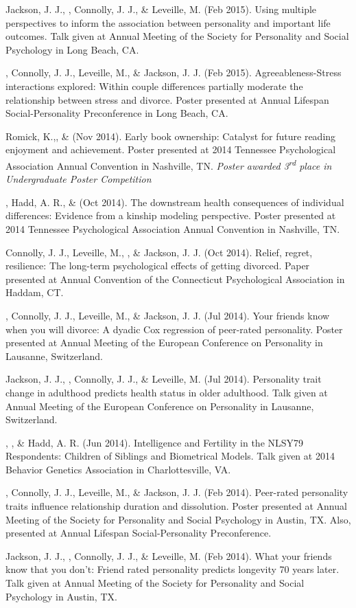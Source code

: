 %
\item Jackson, J. J., \meb, Connolly, J. J., \& Leveille, M. (Feb 2015). Using multiple perspectives to inform the association between personality and important life outcomes. Talk given at Annual Meeting of the Society for Personality and Social Psychology in Long Beach, CA.
%
\item\meb, Connolly, J. J., Leveille, M., \& Jackson, J. J. (Feb 2015). Agreeableness-Stress interactions explored: Within couple differences partially moderate the relationship between stress and divorce. Poster presented at Annual Lifespan Social-Personality Preconference in Long Beach, CA.
%
\item Romick, K.,\nota \meb, \& \joe (Nov 2014). Early book ownership: Catalyst for future reading enjoyment and achievement. Poster presented at 2014 Tennessee Psychological Association Annual Convention in  Nashville, TN. \textit{Poster awarded 3\textsuperscript{rd} place in Undergraduate Poster Competition}
%
\item\meb, Hadd, A. R., \& \joe (Oct 2014). The downstream health consequences of individual differences: Evidence from a kinship modeling perspective. Poster presented at 2014 Tennessee Psychological Association Annual Convention in Nashville, TN.
%
\item Connolly, J. J., Leveille, M., \meb, \& Jackson, J. J. (Oct 2014). Relief, regret, resilience: The long-term psychological effects of getting divorced. Paper presented at Annual Convention of the Connecticut Psychological Association in Haddam, CT.
%
\item\meb, Connolly, J. J., Leveille, M., \& Jackson, J. J. (Jul 2014). Your friends know when you will divorce: A dyadic Cox regression of peer-rated personality. Poster presented at Annual Meeting of the European Conference on Personality in Lausanne, Switzerland.
%
\item Jackson, J. J., \meb, Connolly, J. J., \& Leveille, M. (Jul 2014). Personality trait change in adulthood predicts health status in older adulthood. Talk given at Annual Meeting of the European Conference on Personality in Lausanne, Switzerland.
%
\item \joe, \meb, \& Hadd, A. R. (Jun 2014). Intelligence and Fertility in the NLSY79 Respondents: Children of Siblings and Biometrical Models. Talk given at 2014 Behavior Genetics Association in Charlottesville, VA.
%
\item\meb, Connolly, J. J., Leveille, M., \& Jackson, J. J. (Feb 2014). Peer-rated personality traits influence relationship duration and dissolution. Poster presented at Annual Meeting of the Society for Personality and Social Psychology in Austin, TX. Also, presented at Annual Lifespan Social-Personality Preconference.
%
\item Jackson, J. J., \meb, Connolly, J. J., \& Leveille, M. (Feb 2014). What your friends know that you don't: Friend rated personality predicts longevity 70 years later. Talk given at Annual Meeting of the Society for Personality and Social Psychology in Austin, TX.
%


